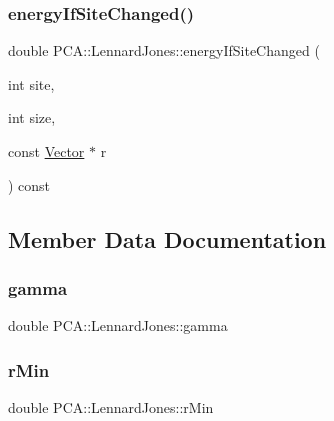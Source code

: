 \hypertarget{class_p_c_a_1_1_lennard_jones_a4ea7171851de5aec43842d769c54e4e9}{}\label{class_p_c_a_1_1_lennard_jones_a4ea7171851de5aec43842d769c54e4e9} 
\subsubsection{\texorpdfstring{energy\+If\+Site\+Changed()}{energyIfSiteChanged()}}
{\footnotesize\ttfamily double P\+C\+A\+::\+Lennard\+Jones\+::energy\+If\+Site\+Changed (\begin{DoxyParamCaption}\item[{int}]{site,  }\item[{int}]{size,  }\item[{const \hyperlink{class_p_c_a_1_1_vector}{Vector} $\ast$}]{r }\end{DoxyParamCaption}) const}



\subsection{Member Data Documentation}
\hypertarget{class_p_c_a_1_1_lennard_jones_ad28ea138038c2c43e9fd000752ea6130}{}\label{class_p_c_a_1_1_lennard_jones_ad28ea138038c2c43e9fd000752ea6130} 
\subsubsection{\texorpdfstring{gamma}{gamma}}
{\footnotesize\ttfamily double P\+C\+A\+::\+Lennard\+Jones\+::gamma\hspace{0.3cm}{\ttfamily [private]}}

\hypertarget{class_p_c_a_1_1_lennard_jones_aa59f5f2bb7cf5c83a33a7f95d23ef4c8}{}\label{class_p_c_a_1_1_lennard_jones_aa59f5f2bb7cf5c83a33a7f95d23ef4c8} 
\subsubsection{\texorpdfstring{r\+Min}{rMin}}
{\footnotesize\ttfamily double P\+C\+A\+::\+Lennard\+Jones\+::r\+Min\hspace{0.3cm}{\ttfamily [private]}}



